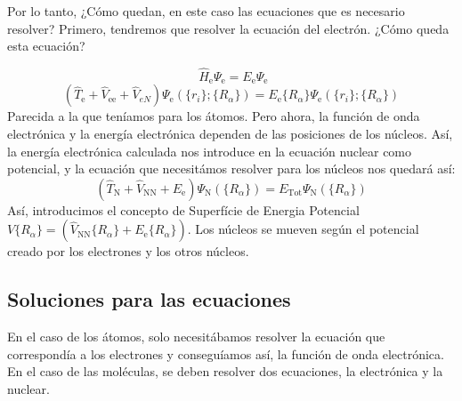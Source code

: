 \documentclass{tufte-book}
\begin{document}
Por lo tanto, ¿Cómo quedan, en este caso las ecuaciones que es necesario resolver? Primero, tendremos que resolver la ecuación del electrón. ¿Cómo queda esta ecuación?

\begin{equation} 
    \hat{H}_\mathrm{e}\Psi_\mathrm{e}=E_\mathrm{e}\Psi_\mathrm{e} 
\end{equation}
\begin{equation}
    (\hat{T}_\mathrm{e} + \hat{V}_\mathrm{ee} +\hat{V}_{eN})\Psi_\mathrm{e}(\{r_i\};\{R_\alpha\})
    = E_\mathrm{e}\{R_\alpha\}\Psi_\mathrm{e}(\{r_i\};\{R_\alpha\})
\end{equation}
Parecida a la que teníamos para los átomos. Pero ahora, la función de onda electrónica y la energía electrónica dependen de las posiciones de los núcleos. Así, la energía electrónica calculada nos introduce en la ecuación nuclear como potencial, y la ecuación que necesitámos resolver para los núcleos nos quedará así:
\begin{equation}
    (\hat{T}_\mathrm{N} + \hat{V}_\mathrm{NN} +E_\mathrm{e})\Psi_\mathrm{N}(\{R_\alpha\})
    = E_\mathrm{Tot}\Psi_\mathrm{N}(\{R_\alpha\})
\end{equation}
Así, introducimos el concepto de Superfície de Energia Potencial $V\{R_\alpha\}=(\hat{V}_\mathrm{NN}\{R_\alpha\}+E_\mathrm{e}\{R_\alpha\})$. Los núcleos se mueven según el potencial creado por los electrones y los otros núcleos.

\subsection{Soluciones para las ecuaciones}
En el caso de los átomos, solo necesitábamos  resolver la ecuación que correspondía a los electrones y conseguíamos así, la función de onda electrónica. En el caso de las moléculas, se deben resolver dos ecuaciones, la electrónica y la nuclear.
\end{document}
